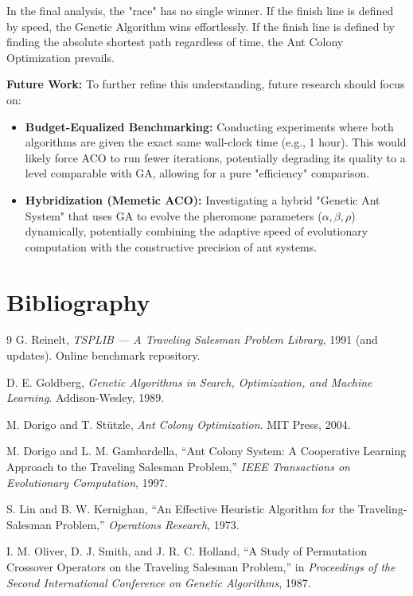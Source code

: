 \documentclass[11pt,a4paper]{article}
\begin{document}
In the final analysis, the "race" has no single winner. If the finish line is defined by speed, the Genetic Algorithm wins effortlessly. If the finish line is defined by finding the absolute shortest path regardless of time, the Ant Colony Optimization prevails.

\textbf{Future Work:}
To further refine this understanding, future research should focus on:
\begin{itemize}[nosep]
  \item \textbf{Budget-Equalized Benchmarking:} Conducting experiments where both algorithms are given the exact same wall-clock time (e.g., 1 hour). This would likely force ACO to run fewer iterations, potentially degrading its quality to a level comparable with GA, allowing for a pure "efficiency" comparison.
  \item \textbf{Hybridization (Memetic ACO):} Investigating a hybrid "Genetic Ant System" that uses GA to evolve the pheromone parameters ($\alpha, \beta, \rho$) dynamically, potentially combining the adaptive speed of evolutionary computation with the constructive precision of ant systems.
\end{itemize}

\section{Bibliography}
\begin{thebibliography}{9}
G. Reinelt, \emph{TSPLIB --- A Traveling Salesman Problem Library}, 1991 (and updates). Online benchmark repository.

D. E. Goldberg, \emph{Genetic Algorithms in Search, Optimization, and Machine Learning}. Addison-Wesley, 1989.

M. Dorigo and T. St\"utzle, \emph{Ant Colony Optimization}. MIT Press, 2004.

M. Dorigo and L. M. Gambardella, ``Ant Colony System: A Cooperative Learning Approach to the Traveling Salesman Problem,'' \emph{IEEE Transactions on Evolutionary Computation}, 1997.

S. Lin and B. W. Kernighan, ``An Effective Heuristic Algorithm for the Traveling-Salesman Problem,'' \emph{Operations Research}, 1973.

I. M. Oliver, D. J. Smith, and J. R. C. Holland, ``A Study of Permutation Crossover Operators on the Traveling Salesman Problem,'' in \emph{Proceedings of the Second International Conference on Genetic Algorithms}, 1987.
\end{thebibliography}
\end{document}
